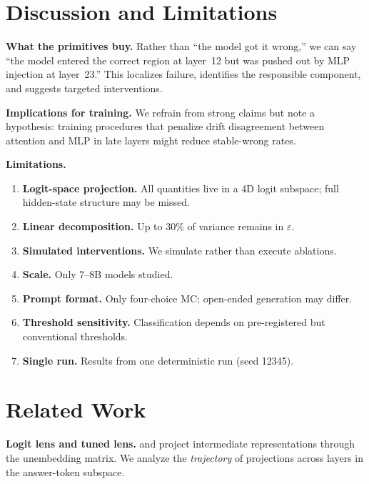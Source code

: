 \documentclass{article}
\begin{document}
\FloatBarrier


\section{Discussion and Limitations}
\label{sec:discussion}

\textbf{What the primitives buy.}  Rather than ``the model got it wrong,'' we can say ``the model entered the correct region at layer~12 but was pushed out by MLP injection at layer~23.''  This localizes failure, identifies the responsible component, and suggests targeted interventions.

\textbf{Implications for training.}  We refrain from strong claims but note a hypothesis: training procedures that penalize drift disagreement between attention and MLP in late layers might reduce stable-wrong rates.

\textbf{Limitations.}
\vspace{-0.5em}
\begin{enumerate}\setlength{\itemsep}{0pt}
\item \textbf{Logit-space projection.}  All quantities live in a 4D logit subspace; full hidden-state structure may be missed.
\item \textbf{Linear decomposition.}  Up to 30\% of variance remains in $\varepsilon$.
\item \textbf{Simulated interventions.}  We simulate rather than execute ablations.
\item \textbf{Scale.}  Only 7--8B models studied.
\item \textbf{Prompt format.}  Only four-choice MC; open-ended generation may differ.
\item \textbf{Threshold sensitivity.}  Classification depends on pre-registered but conventional thresholds.
\item \textbf{Single run.}  Results from one deterministic run (seed 12345).
\end{enumerate}


\section{Related Work}

\textbf{Logit lens and tuned lens.}  \citet{nostalgebraist2020} and \citet{belrose2023} project intermediate representations through the unembedding matrix.  We analyze the \emph{trajectory} of projections across layers in the answer-token subspace.
\end{document}
